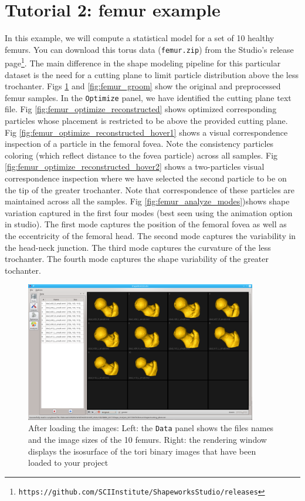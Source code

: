 \documentclass[letterpaper,12pt]{article}   %
\begin{document}
\section{Tutorial 2: femur example}

In this example, we will compute a statistical model for a set of 10 healthy femurs.  You can download this torus data (\texttt{femur.zip}) from the Studio's release page\footnote{\texttt{https://github.com/SCIInstitute/ShapeworksStudio/releases}}. The main difference in the shape modeling pipeline for this particular dataset is the need for a cutting plane to limit particle distribution above the less trochanter. Figs \ref{fig:femur_data} and \ref{fig:femur_groom} show the original and preprocessed femur samples. In the \texttt{Optimize} panel, we have identified the cutting plane text file. Fig \ref{fig:femur_optimize_reconstructed} shows optimized corresponding particles whose placement is restricted to be above the provided cutting plane. Fig \ref{fig:femur_optimize_reconstructed_hover1} shows a visual correspondence inspection of a particle in the femoral fovea. Note the consistency particles coloring (which reflect distance to the fovea particle) across all samples. Fig \ref{fig:femur_optimize_reconstructed_hover2} shows a two-particles visual correspondence inspection where we have selected the second particle to be on the tip of the greater trochanter. Note that correspondence of these particles are maintained across all  the samples. Fig \ref{fig:femur_analyze_modes})shows shape variation captured in the first four modes (best seen using the animation option in studio). The first mode captures the position of the femoral fovea as well as the eccentricity of the femoral head. The second mode captures the variability in the head-neck junction. The third mode captures the curvature of the less trochanter. The fourth mode captures the shape variability of the greater tochanter.


\begin{figure}[!htp]
	\centering
	\includegraphics[width=0.9\textwidth]{figs_v2/femur_data.png}
	\caption{After loading the images: Left: the \texttt{Data} panel shows the files names and the image sizes of the 10 femurs. Right: the rendering window displays the isosurface of the tori binary images that have been loaded to your project}
	\label{fig:femur_data}
\end{figure}
\end{document}
